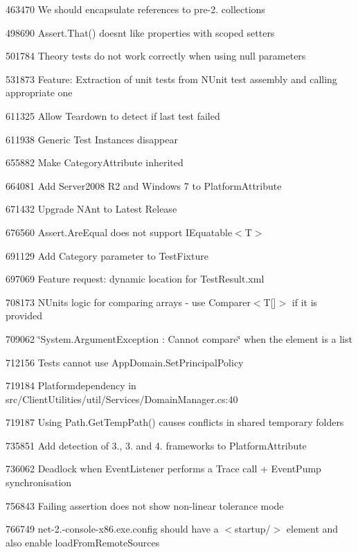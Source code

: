 \begin{DoxyItemize}
\item 463470 We should encapsulate references to pre-\/2. collections
\item 498690 Assert.\+That() doesn\textquotesingle{}t like properties with scoped setters
\item 501784 Theory tests do not work correctly when using null parameters
\item 531873 Feature\+: Extraction of unit tests from N\+Unit test assembly and calling appropriate one
\item 611325 Allow Teardown to detect if last test failed
\item 611938 Generic Test Instances disappear
\item 655882 Make Category\+Attribute inherited
\item 664081 Add Server2008 R2 and Windows 7 to Platform\+Attribute
\item 671432 Upgrade N\+Ant to Latest Release
\item 676560 Assert.\+Are\+Equal does not support {\ttfamily I\+Equatable$<$T$>$}
\item 691129 Add Category parameter to Test\+Fixture
\item 697069 Feature request\+: dynamic location for Test\+Result.\+xml
\item 708173 N\+Unit\textquotesingle{}s logic for comparing arrays -\/ use {\ttfamily Comparer$<$T[]$>$} if it is provided
\item 709062 \char`\"{}\+System.\+Argument\+Exception \+: Cannot compare\char`\"{} when the element is a list
\item 712156 Tests cannot use App\+Domain.\+Set\+Principal\+Policy
\item 719184 Platformdependency in src/\+Client\+Utilities/util/\+Services/\+Domain\+Manager.\+cs\+:40
\item 719187 Using Path.\+Get\+Temp\+Path() causes conflicts in shared temporary folders
\item 735851 Add detection of 3., 3. and 4. frameworks to Platform\+Attribute
\item 736062 Deadlock when Event\+Listener performs a Trace call + Event\+Pump synchronisation
\item 756843 Failing assertion does not show non-\/linear tolerance mode
\item 766749 net-\/2.-\/console-\/x86.\+exe.\+config should have a {\ttfamily $<$startup/$>$} element and also enable load\+From\+Remote\+Sources

\end{DoxyItemize}
